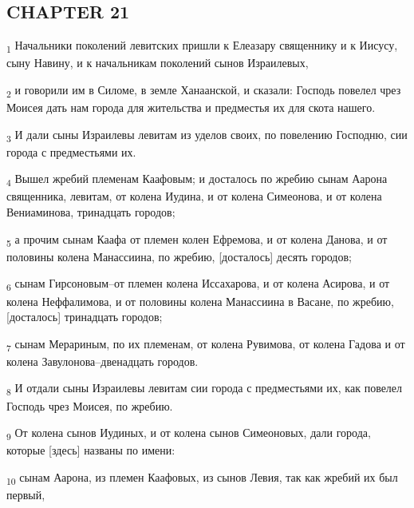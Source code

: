 \subsection{CHAPTER 21}
\begin{tcolorbox}
\textsubscript{1} Начальники поколений левитских пришли к Елеазару священнику и к Иисусу, сыну Навину, и к начальникам поколений сынов Израилевых,
\end{tcolorbox}
\begin{tcolorbox}
\textsubscript{2} и говорили им в Силоме, в земле Ханаанской, и сказали: Господь повелел чрез Моисея дать нам города для жительства и предместья их для скота нашего.
\end{tcolorbox}
\begin{tcolorbox}
\textsubscript{3} И дали сыны Израилевы левитам из уделов своих, по повелению Господню, сии города с предместьями их.
\end{tcolorbox}
\begin{tcolorbox}
\textsubscript{4} Вышел жребий племенам Каафовым; и досталось по жребию сынам Аарона священника, левитам, от колена Иудина, и от колена Симеонова, и от колена Вениаминова, тринадцать городов;
\end{tcolorbox}
\begin{tcolorbox}
\textsubscript{5} а прочим сынам Каафа от племен колен Ефремова, и от колена Данова, и от половины колена Манассиина, по жребию, [досталось] десять городов;
\end{tcolorbox}
\begin{tcolorbox}
\textsubscript{6} сынам Гирсоновым--от племен колена Иссахарова, и от колена Асирова, и от колена Неффалимова, и от половины колена Манассиина в Васане, по жребию, [досталось] тринадцать городов;
\end{tcolorbox}
\begin{tcolorbox}
\textsubscript{7} сынам Мерариным, по их племенам, от колена Рувимова, от колена Гадова и от колена Завулонова--двенадцать городов.
\end{tcolorbox}
\begin{tcolorbox}
\textsubscript{8} И отдали сыны Израилевы левитам сии города с предместьями их, как повелел Господь чрез Моисея, по жребию.
\end{tcolorbox}
\begin{tcolorbox}
\textsubscript{9} От колена сынов Иудиных, и от колена сынов Симеоновых, дали города, которые [здесь] названы по имени:
\end{tcolorbox}
\begin{tcolorbox}
\textsubscript{10} сынам Аарона, из племен Каафовых, из сынов Левия, так как жребий их был первый,
\end{tcolorbox}
